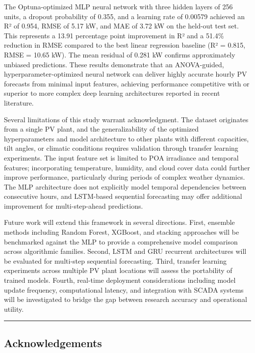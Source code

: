 \documentclass[
  11pt,
]{article}
\begin{document}
The Optuna-optimized MLP neural network with three hidden layers of 256
units, a dropout probability of 0.355, and a learning rate of 0.00579
achieved an R² of 0.954, RMSE of 5.17 kW, and MAE of 3.72 kW on the
held-out test set. This represents a 13.91 percentage point improvement
in R² and a 51.4\% reduction in RMSE compared to the best linear
regression baseline (R² = 0.815, RMSE = 10.65 kW). The mean residual of
0.281 kW confirms approximately unbiased predictions. These results
demonstrate that an ANOVA-guided, hyperparameter-optimized neural
network can deliver highly accurate hourly PV forecasts from minimal
input features, achieving performance competitive with or superior to
more complex deep learning architectures reported in recent literature.

Several limitations of this study warrant acknowledgment. The dataset
originates from a single PV plant, and the generalizability of the
optimized hyperparameters and model architecture to other plants with
different capacities, tilt angles, or climatic conditions requires
validation through transfer learning experiments. The input feature set
is limited to POA irradiance and temporal features; incorporating
temperature, humidity, and cloud cover data could further improve
performance, particularly during periods of complex weather dynamics.
The MLP architecture does not explicitly model temporal dependencies
between consecutive hours, and LSTM-based sequential forecasting may
offer additional improvement for multi-step-ahead predictions.

Future work will extend this framework in several directions. First,
ensemble methods including Random Forest, XGBoost, and stacking
approaches will be benchmarked against the MLP to provide a
comprehensive model comparison across algorithmic families. Second, LSTM
and GRU recurrent architectures will be evaluated for multi-step
sequential forecasting. Third, transfer learning experiments across
multiple PV plant locations will assess the portability of trained
models. Fourth, real-time deployment considerations including model
update frequency, computational latency, and integration with SCADA
systems will be investigated to bridge the gap between research accuracy
and operational utility.

\begin{center}\rule{0.5\linewidth}{0.5pt}\end{center}

\subsection{Acknowledgements}\label{acknowledgements}
\end{document}
